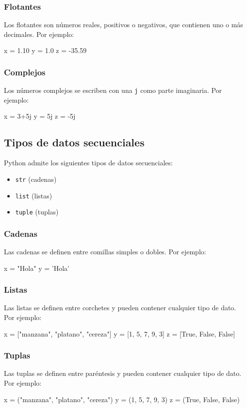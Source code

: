 \documentclass{article}
\begin{document}
\subsubsection{Flotantes}
Los flotantes son números reales, positivos o negativos, que contienen uno o más decimales. Por ejemplo:
\begin{python_code}
x = 1.10
y = 1.0
z = -35.59
\end{python_code}
\subsubsection{Complejos}
Los números complejos se escriben con una \texttt{j} como parte imaginaria. Por ejemplo:
\begin{python_code}
x = 3+5j
y = 5j
z = -5j
\end{python_code}
\subsection{Tipos de datos secuenciales}
Python admite los siguientes tipos de datos secuenciales:
\begin{itemize}
    \item \texttt{str} (cadenas)
    \item \texttt{list} (listas)
    \item \texttt{tuple} (tuplas)
\end{itemize}
\subsubsection{Cadenas}
Las cadenas se definen entre comillas simples o dobles. Por ejemplo:
\begin{python_code}
x = "Hola"
y = 'Hola'
\end{python_code}
\subsubsection{Listas}
Las listas se definen entre corchetes y pueden contener cualquier tipo de dato. Por ejemplo:
\begin{python_code}
x = ["manzana", "platano", "cereza"]
y = [1, 5, 7, 9, 3]
z = [True, False, False]
\end{python_code}
\subsubsection{Tuplas}
Las tuplas se definen entre paréntesis y pueden contener cualquier tipo de dato. Por ejemplo:
\begin{python_code}
x = ("manzana", "platano", "cereza")
y = (1, 5, 7, 9, 3)
z = (True, False, False)
\end{python_code}
\end{document}
